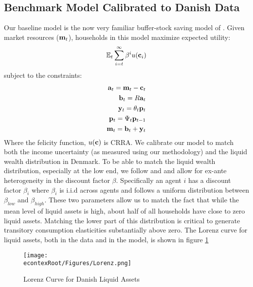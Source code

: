 \documentclass[titlepage]{\econtex}\newcommand{\texname}{ConsumptionHeterogeneity}
\begin{document}
\subsection{Benchmark Model Calibrated to Danish Data} 
Our baseline model is the now very familiar buffer-stock saving model of \cite{carroll_buffer_1997}. Given market resources ($\boldmath{\ensuremath{\mathbf{m}}}_t$), households in this model maximize expected utility:
\begin{align*}
	\mathbb{E}_t \sum_{i=t}^{\infty} \beta^i u(\mathbf{c}_i)
\end{align*}
subject to the constraints:
\begin{align*}
	\mathbf{a}_t = \mathbf{m}_t - \mathbf{c}_t \\
	\mathbf{b}_t = R\mathbf{a}_t \\
	\mathbf{y}_t = \theta_t \mathbf{p}_t \\
	\mathbf{p}_t = \Psi_t \mathbf{p}_{t-1} \\
	\mathbf{m}_t = \mathbf{b}_t + \mathbf{y}_t
\end{align*}
Where the felicity function, $u(\mathbf{c})$ is CRRA. We calibrate our model to match both the income uncertainty (as measured using our methodology) and the liquid wealth distribution in Denmark. To be able to match the liquid wealth distribution, especially at the low end, we follow \cite{krusell_income_1998} and \cite{carroll_distribution_2017} and allow for ex-ante heterogeneity in the discount factor $\beta$. Specifically an agent $i$ has a discount factor $\beta_i$ where $\beta_i$ is i.i.d across agents and follows a uniform distribution between $\beta_{low}$ and $\beta_{high}$. These two parameters allow us to match the fact that while the mean level of liquid assets is high, about half of all households have close to zero liquid assets. Matching the lower part of this distribution is critical to generate transitory consumption elasticities substantially above zero. The Lorenz curve for liquid assets, both in the data and in the model, is shown in figure \ref{fig:Lorenz}
\begin{figure} 
		\centering
		\texttt{[image: \\econtexRoot/Figures/Lorenz.png]}
		\caption{Lorenz Curve for Danish Liquid Assets}
		\label{fig:Lorenz}
\end{figure}
\end{document}
